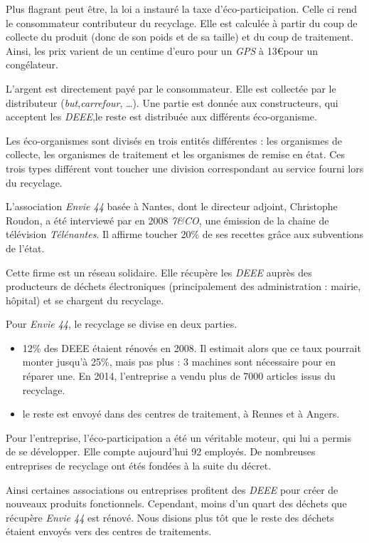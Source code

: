 Plus flagrant peut être, la loi a instauré la taxe d'éco-participation. Celle ci rend le consommateur contributeur du recyclage. Elle est calculée à partir du coup de collecte du produit (donc de son poids et de sa taille) et du coup de traitement. Ainsi, les prix varient de un centime d'euro pour un \textit{GPS} à 13\euro pour un congélateur. 

L'argent est directement payé par le consommateur. Elle est collectée par le distributeur (\textit{but},\textit{carrefour}, \dots). Une partie est donnée aux constructeurs, qui acceptent les \textit{DEEE},le reste est distribuée aux différents éco-organisme. 

Les éco-organismes sont divisés en trois entités différentes : les organismes de collecte, les organismes de traitement et les organismes de remise en état. Ces trois types différent vont toucher une division correspondant au service fourni lors du recyclage. 

\medbreak

L'association \textit{Envie 44} basée à Nantes, dont le directeur adjoint, Christophe Roudon, a été interviewé par en 2008 \textit{7\&CO}, une émission de la chaine de télévision \textit{Télénantes}\cite{7andco}. Il affirme toucher 20\% de ses recettes grâce aux subventions de l'état. 

Cette firme est un réseau solidaire. Elle récupère les \textit{DEEE} auprès des producteurs de déchets électroniques (principalement des administration : mairie, hôpital) et se chargent du recyclage. 

Pour \textit{Envie 44}, le recyclage se divise en deux parties. 
\begin{itemize}
\item 12\% des DEEE étaient rénovés en 2008. Il estimait alors que ce taux pourrait monter jusqu'à 25\%, mais pas plus : 3 machines sont nécessaire pour en réparer une. En 2014, l'entreprise a vendu plus de 7000 articles issus du recyclage. 
\item le reste est envoyé dans des centres de traitement, à Rennes et à Angers.
\end{itemize}

Pour l'entreprise, l'éco-participation a été un véritable moteur, qui lui a permis de se développer. Elle compte aujourd'hui 92 employés. De nombreuses entreprises de recyclage ont étés fondées à la suite du décret. 


\bigbreak

Ainsi certaines associations ou entreprises profitent des \textit{DEEE} pour créer de nouveaux produits fonctionnels. Cependant, moins d'un quart des déchets que récupère \textit{Envie 44} est rénové. Nous disions plus tôt que le reste des déchets étaient envoyés vers  des centres de traitements. 

